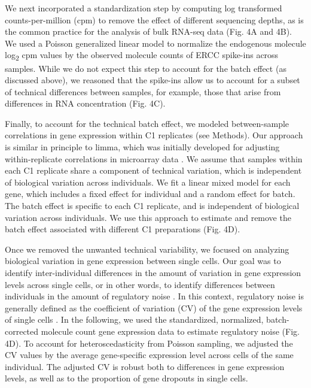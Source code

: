 We next incorporated a standardization step by computing log transformed
counts-per-million (cpm) to remove the effect of different sequencing
depths, as is the common practice for the analysis of bulk RNA-seq data
(Fig. 4A and 4B). We used a Poisson generalized linear model to
normalize the endogenous molecule log\textsubscript{2} cpm values by the
observed molecule counts of ERCC spike-ins across samples. While we do
not expect this step to account for the batch effect (as discussed
above), we reasoned that the spike-ins allow us to account for a subset
of technical differences between samples, for example, those that arise
from differences in RNA concentration (Fig. 4C).

Finally, to account for the technical batch effect, we modeled
between-sample correlations in gene expression within C1 replicates (see
Methods). Our approach is similar in principle to limma, which was
initially developed for adjusting within-replicate correlations in
microarray data \citep{Smyth2005}. We assume that samples within each C1
replicate share a component of technical variation, which is independent
of biological variation across individuals. We fit a linear mixed model
for each gene, which includes a fixed effect for individual and a random
effect for batch. The batch effect is specific to each C1 replicate, and
is independent of biological variation across individuals. We use this
approach to estimate and remove the batch effect associated with
different C1 preparations (Fig. 4D).

Once we removed the unwanted technical variability, we focused on
analyzing biological variation in gene expression between single cells.
Our goal was to identify inter-individual differences in the amount of
variation in gene expression levels across single cells, or in other
words, to identify differences between individuals in the amount of
regulatory noise \citep{Raser2005}. In this context, regulatory noise is
generally defined as the coefficient of variation (CV) of the gene
expression levels of single cells \citep{Fehrmann2013}. In the following,
we used the standardized, normalized, batch-corrected molecule count
gene expression data to estimate regulatory noise (Fig. 4D). To account
for heteroscedasticity from Poisson sampling, we adjusted the CV values
by the average gene-specific expression level across cells of the same
individual. The adjusted CV is robust both to differences in gene
expression levels, as well as to the proportion of gene dropouts in
single cells.

